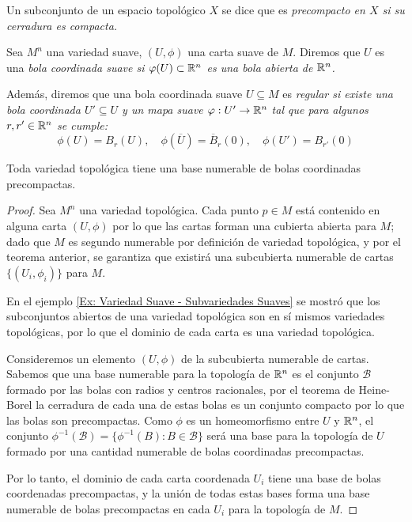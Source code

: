\begin{definition}\label{Definición: Subconjunto Precompacto}
	Un subconjunto de un espacio topológico $X$ se dice que es \it{precompacto} en $X$ si su cerradura es compacta.
\end{definition}


\begin{definition}\label{Definición: Bolas Coordinadas Suaves}
	Sea $M^n$ una variedad suave, $(U,\phi)$ una carta suave de $M$. Diremos que $U$ es una \it{bola coordinada suave} si $\varphi(U) \subset \mathbb{R}^n$ es una bola abierta de $\mathbb{R}^n$.

	Además, diremos que una bola coordinada suave $U \subseteq M$ es \it{regular} si existe una bola coordinada $U' \subseteq U$ y un mapa suave $\varphi: U' \to \mathbb{R}^n$ tal que para algunos $r, r' \in \mathbb{R}^n$ se cumple:
	\[
		\phi(U) = B_r(U), \quad \phi(\overline{U}) = \overline{B}_r(0), \quad \phi(U') = B_{r'}(0)
	\]
\end{definition}

\begin{lemma}\label{Lemma: Bolas Precompactas}
	Toda variedad topológica tiene una base numerable de bolas coordinadas precompactas.
\end{lemma}

\begin{proof}
	Sea $M^n$ una variedad topológica. Cada punto $p \in M$ está contenido en alguna carta $(U,\phi)$ por lo que las cartas forman una cubierta abierta para $M$; dado que $M$ es segundo numerable por definición de variedad topológica, y por el teorema anterior, se garantiza que existirá una subcubierta numerable de cartas $\{(U_i,\phi_i)\}$ para $M$.

	En el ejemplo \ref{Ex: Variedad Suave - Subvariedades Suaves} se mostró que los subconjuntos abiertos de una variedad topológica son en sí mismos variedades topológicas, por lo que el dominio de cada carta es una variedad topológica.

	Consideremos un elemento $(U,\phi)$ de la subcubierta numerable de cartas. Sabemos que una base numerable para la topología de $\mathbb{R}^n$ es el conjunto $\mathcal{B}$ formado por las bolas con radios y centros racionales, por el teorema de Heine-Borel la cerradura de cada una de estas bolas es un conjunto compacto por lo que las bolas son precompactas. Como $\phi$ es un homeomorfismo entre $U$ y $\mathbb{R}^n$, el conjunto $\phi^{-1} (\mathcal{B})= \{\phi^{-1}(B): B \in \mathcal{B}\}$ será una base para la topología de $U$ formado por una cantidad numerable de bolas coordinadas precompactas.

	Por lo tanto, el dominio de cada carta coordenada $U_i$ tiene una base de bolas coordenadas precompactas, y la unión de todas estas bases forma una base numerable de bolas precompactas en cada $U_i$ para la topología de $M$.
\end{proof}


